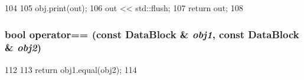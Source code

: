\begin{DoxyCode}
104 {
105     obj.print(out);
106     out << std::flush;
107     return out;
108 }
\end{DoxyCode}
\hypertarget{DataBlock_8hh_af75f4dd45886bfab23035bbbd4922c83}{
\subsubsection[{operator==}]{\setlength{\rightskip}{0pt plus 5cm}bool operator== (const {\bf DataBlock} \& {\em obj1}, \/  const {\bf DataBlock} \& {\em obj2})}}
\label{DataBlock_8hh_af75f4dd45886bfab23035bbbd4922c83}



\begin{DoxyCode}
112 {
113     return obj1.equal(obj2);
114 }
\end{DoxyCode}
